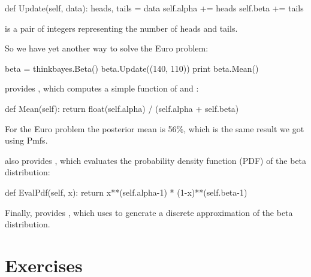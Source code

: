 \documentclass[12pt]{book}
\theoremstyle{exercise}
\begin{document}
\begin{code}
    def Update(self, data):
        heads, tails = data
        self.alpha += heads
        self.beta += tails
\end{code}

 is a pair of integers representing the number of
heads and tails.

So we have yet another way to solve the Euro problem:

\begin{code}
    beta = thinkbayes.Beta()
    beta.Update((140, 110))
    print beta.Mean()
\end{code}

 provides , which 
computes a simple function of 
and :

\begin{code}
    def Mean(self):
        return float(self.alpha) / (self.alpha + self.beta)
\end{code}

For the Euro problem the posterior mean is 56\%, which is the
same result we got using Pmfs.  

 also provides , which evaluates
the probability density
function (PDF)  of the beta distribution:

\begin{code}
    def EvalPdf(self, x):
        return x**(self.alpha-1) * (1-x)**(self.beta-1)
\end{code}

Finally,  provides , which
uses  to generate a discrete approximation
of the beta distribution.





\section{Exercises}
\end{document}
